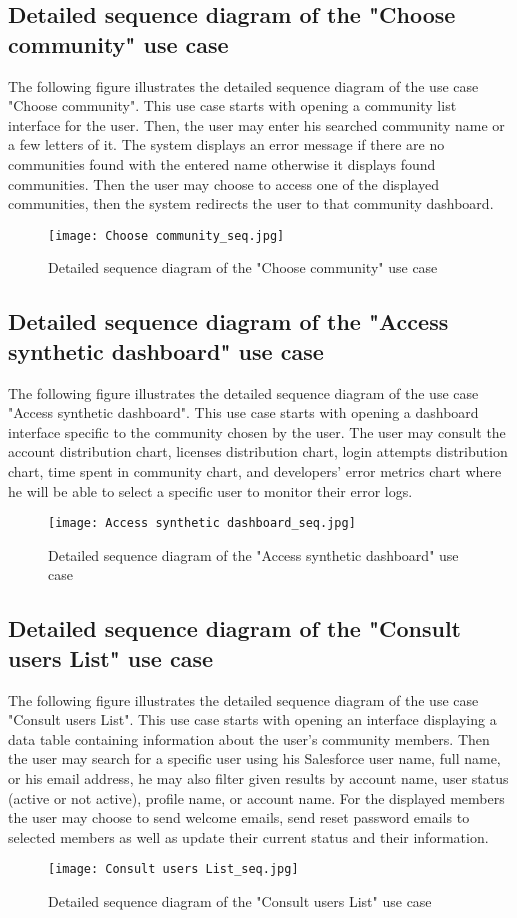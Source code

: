 \subsection{Detailed sequence diagram of the "Choose community" use case}
The following figure illustrates the detailed sequence diagram of the use case
"Choose community".
This use case starts with opening a community list interface
for the user. Then, the user may enter his searched community name or a few letters of it.
The system displays an error message if there are no communities found with the entered name otherwise it displays found communities. Then the user may choose to access one of the displayed communities, then the system redirects the user to that community dashboard. 
\begin{figure}[H]%
    \center   
    \texttt{[image: Choose community\_seq.jpg]}
    \caption{Detailed sequence diagram of the "Choose community" use case}
\end{figure}
\subsection{Detailed sequence diagram of the "Access synthetic dashboard" use case}
The following figure illustrates the detailed sequence diagram of the use case
"Access synthetic dashboard".
This use case starts with opening a dashboard interface specific to the community chosen
by the user. The user may consult the account distribution chart, licenses distribution chart, login attempts distribution chart, time spent in community chart, and developers' error metrics chart where he will be able to select a specific user to monitor their error logs.
  \begin{figure}[H]%
    \center   
    \texttt{[image: Access synthetic dashboard\_seq.jpg]}
    \caption{Detailed sequence diagram of the "Access synthetic dashboard" use case}
\end{figure}

\subsection{Detailed sequence diagram of the "Consult users List" use case}
The following figure illustrates the detailed sequence diagram of the use case
"Consult users List".
This use case starts with opening an interface displaying a data table containing information about the user's community members. Then the user may search for a specific user using his Salesforce user name, full name, or his email address, he may also filter given results by account name, user status (active or not active), profile name, or account name. For the displayed members the user may choose to send welcome emails, send reset password emails to selected members as well as update their current status and their information.
 \begin{figure}[H]%
    \center   
    \texttt{[image: Consult users List\_seq.jpg]}
    \caption{Detailed sequence diagram of the "Consult users List" use case}
\end{figure}
